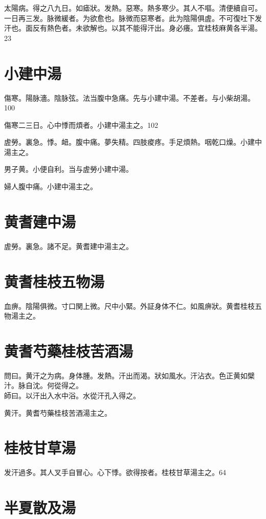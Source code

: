 \documentclass[b5paper,twoside,zihao=-4,UTF8]{ctexbook}
\begin{document}
太陽病。得之八九日。如瘧狀。发熱。惡寒。熱多寒少。其人不嘔。清便續自可。一日再三发。脉微緩者。为欲愈也。脉微而惡寒者。此为陰陽俱虗。不可復{吐下}发汗也。面反有熱色者。未欲解也。以其不能得汗出。身必癢。宜桂枝麻黄各半湯。23

\section{小建中湯}

傷寒。陽脉濇。陰脉弦。法当腹中急痛。先与小建中湯。不差者。与小柴胡湯。100

傷寒二三日。心中悸而煩者。小建中湯主之。102

虗勞。裏急。悸。衄。腹中痛。夢失精。四肢痠疼。手足煩熱。咽乾口燥。小建中湯主之。

男子黄。小便自利。当与虗勞小建中湯。

婦人腹中痛。小建中湯主之。

\section{黄耆建中湯}

虗勞。裏急。諸不足。黄耆建中湯主之。

\section{黄耆桂枝五物湯}

血痹。陰陽俱微。寸口関上微。尺中小緊。外証身体不仁。如風痹狀。黄耆桂枝五物湯主之。

\section{黄耆芍藥桂枝苦酒湯}

問曰。黄汗之为病。身体腫。发熱。汗出而渴。狀如風水。汗沾衣。色正黄如檗汁。脉自沈。何從得之。\\
師曰。以汗出入水中浴。水從汗孔入得之。

黄汗。黄耆芍藥桂枝苦酒湯主之。

\section{桂枝甘草湯}

发汗過多。其人叉手自冒心。心下悸。欲得按者。桂枝甘草湯主之。64

\section{半夏散及湯}
\end{document}
